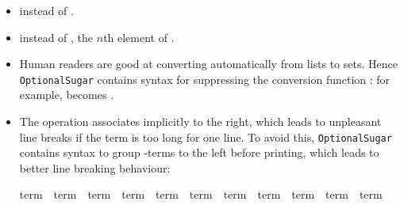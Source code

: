 \begin{isabellebody}
\begin{isamarkuptext}
\begin{itemize}
\item {} instead of .
\item {} instead of ,
      the $n$th element of .

\item Human readers are good at converting automatically from lists to
sets. Hence \texttt{OptionalSugar} contains syntax for suppressing the
conversion function : for example, 
becomes .

\item The \isa{{\isacharat}} operation associates implicitly to the right,
which leads to unpleasant line breaks if the term is too long for one
line. To avoid this, \texttt{OptionalSugar} contains syntax to group
\isa{{\isacharat}}-terms to the left before printing, which leads to better
line breaking behaviour:
\begin{isabelle}%
term\ \isacharat\ term\ \isacharat\ term\ \isacharat\ term\ \isacharat\ term\ \isacharat\ term\ \isacharat\ term\ \isacharat\ term\ \isacharat\ term\ \isacharat\ term\ \isacharat\ term%
\end{isabelle}


\end{itemize}
\end{isamarkuptext}
\end{isabellebody}
